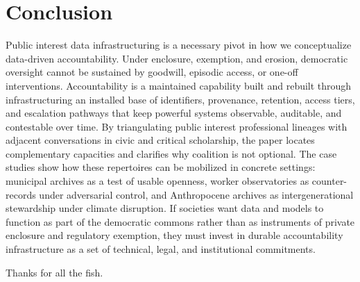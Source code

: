 \documentclass[acmsmall,screen]{acmart}
\begin{document}
\section*{Conclusion}
Public interest data infrastructuring is a necessary pivot in how we conceptualize data-driven accountability. Under enclosure, exemption, and erosion, democratic oversight cannot be sustained by goodwill, episodic access, or one-off interventions. Accountability is a maintained capability built and rebuilt through infrastructuring an installed base of identifiers, provenance, retention, access tiers, and escalation pathways that keep powerful systems observable, auditable, and contestable over time.  By triangulating public interest professional lineages with adjacent conversations in civic and critical scholarship, the paper locates complementary capacities and clarifies why coalition is not optional. The case studies show how these repertoires can be mobilized in concrete settings: municipal archives as a test of usable openness, worker observatories as counter-records under adversarial control, and Anthropocene archives as intergenerational stewardship under climate disruption. If societies want data and models to function as part of the democratic commons rather than as instruments of private enclosure and regulatory exemption, they must invest in durable accountability infrastructure as a set of technical, legal, and institutional commitments.

\begin{acks}
Thanks for all the fish.
\end{acks}



\end{document}
